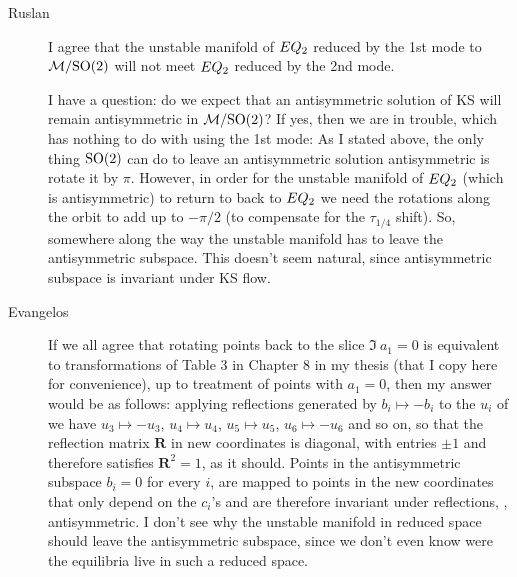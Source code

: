 \begin{description}
\item[Ruslan]
 I agree that the unstable manifold of $EQ_{2}$ reduced by
 the 1st mode to ${\cal M}/\textrm{SO}(2)$ will not meet $EQ_{2}$ reduced by
 the 2nd mode. \par I have a question: do we expect that an
 antisymmetric solution of KS will remain antisymmetric in
 ${\cal M}/\textrm{SO}(2)$?  If yes, then we are in trouble, which has
 nothing to do with using the 1st mode: As I stated above,
 the only thing $\textrm{SO}(2)$ can do to leave an antisymmetric
 solution antisymmetric is rotate it by $\pi$.  However, in
 order for the unstable manifold of $EQ_{2}$ (which is
 antisymmetric) to return to back to $EQ_{2}$ we need the
 rotations along the orbit to add up to $-\pi/2$ (to
 compensate for the $\tau_{1/4}$ shift).  So, somewhere along
 the way the unstable manifold has to leave the antisymmetric
 subspace.  This doesn't seem natural, since antisymmetric
 subspace is invariant under KS flow.

\item[Evangelos]
If we all agree that rotating points back to the slice $\Im\
a_1=0$ is equivalent to transformations of Table 3 in Chapter
8 in my thesis (that I copy here for convenience), up to
treatment of points with $a_1=0$, then my answer would be as
follows: applying reflections generated by $b_i\mapsto - b_i$
to the $u_i$ of  we have $u_3\mapsto -u_3$,
$u_4\mapsto u_4$, $u_5\mapsto u_5$, $u_6\mapsto -u_6$ and so
on, so that the reflection matrix $\mathbf{R}$ in new
coordinates is diagonal, with entries $\pm 1$ and therefore
satisfies $\mathbf{R}^2=1$, as it should. Points in the
antisymmetric subspace $b_i=0$ for every $i$, are mapped to
points in the new coordinates that only depend on the $c_i$'s
and are therefore invariant under reflections, \ie,
antisymmetric. I don't see why the unstable manifold in
reduced space should leave the antisymmetric subspace, since
we don't even know were the equilibria live in such a reduced
space.




\end{description}
